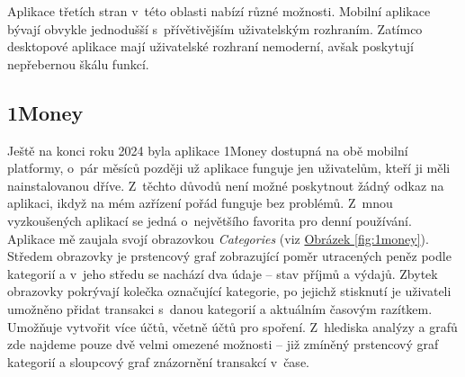 \documentclass[
  biblatex,
  figures=true,
  tables=false,
  glossaries,
  index
]{kidiplom}
\begin{document}
Aplikace třetích stran v~této oblasti nabízí různé možnosti. Mobilní aplikace bývají obvykle jednodušší s~přívětivějším uživatelským rozhraním. Zatímco desktopové aplikace mají uživatelské rozhraní nemoderní, avšak poskytují nepřebernou škálu funkcí.

\subsection{1Money}
Ještě na konci roku 2024 byla aplikace 1Money dostupná na obě mobilní platformy, o~pár měsíců později už aplikace funguje jen uživatelům, kteří ji měli nainstalovanou dříve. Z~těchto důvodů není možné poskytnout žádný odkaz na aplikaci, ikdyž na mém azřízení pořád funguje bez problémů. Z~mnou vyzkoušených aplikací se jedná o~největšího favorita pro denní používání. Aplikace mě zaujala svojí obrazovkou \textit{Categories} (viz \hyperref[fig:1money]{Obrázek \ref{fig:1money}}).  Středem obrazovky je prstencový graf zobrazující poměr utracených peněz podle kategorií a v~jeho středu se nachází dva údaje -- stav příjmů a výdajů. Zbytek obrazovky pokrývají kolečka označující kategorie, po jejichž stisknutí je uživateli umožněno přidat transakci s~danou kategorií a aktuálním časovým razítkem. Umožňuje vytvořit více účtů, včetně účtů pro spoření. Z~hlediska analýzy a grafů zde najdeme pouze dvě velmi omezené možnosti -- již zmíněný prstencový graf kategorií a sloupcový graf znázornění transakcí v~čase.
\end{document}
